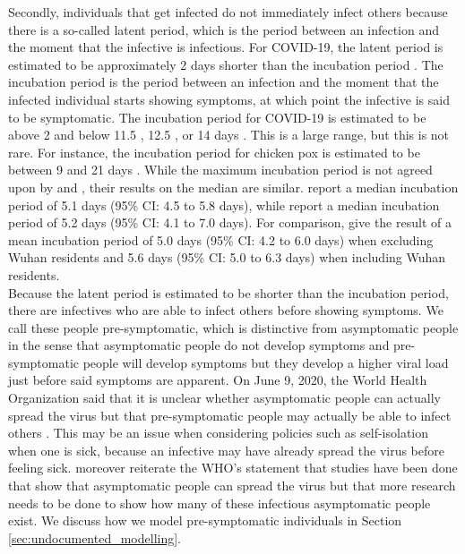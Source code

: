 \documentclass[12pt]{article}
\begin{document}
	Secondly, individuals that get infected do not immediately infect others because there is a so-called latent period, which is the period between an infection and the moment that the infective is infectious. For COVID-19, the latent period is estimated to be approximately 2 days shorter than the incubation period \parencite{he2020temporal}. The incubation period is the period between an infection and the moment that the infected individual starts showing symptoms, at which point the infective is said to be symptomatic. The incubation period for COVID-19 is estimated to be above 2 and below 11.5 \parencite{lauer2020incubation}, 12.5 \parencite{li2020incubation}, or 14 days \parencite{linton2020incubation}. This is a large range, but this is not rare. For instance, the incubation period for chicken pox is estimated to be between 9 and 21 days \parencite{papadopoulos2018chickenpox}. While the maximum incubation period is not agreed upon by \textcite{lauer2020incubation} and \textcite{li2020incubation}, their results on the median are similar. \textcite{lauer2020incubation} report a median incubation period of 5.1 days (95\% CI: 4.5 to 5.8 days), while \textcite{li2020incubation} report a median incubation period of 5.2 days (95\% CI: 4.1 to 7.0 days). For comparison, \textcite{linton2020incubation} give the result of a mean incubation period of 5.0 days (95\% CI: 4.2 to 6.0 days) when excluding Wuhan residents and 5.6 days (95\% CI: 5.0 to 6.3 days) when including Wuhan residents. \\
	
	Because the latent period is estimated to be shorter than the incubation period, there are infectives who are able to infect others before showing symptoms. We call these people pre-symptomatic, which is distinctive from asymptomatic people in the sense that asymptomatic people do not develop symptoms and pre-symptomatic people will develop symptoms but they develop a higher viral load just before said symptoms are apparent. On June 9, 2020, the World Health Organization said that it is unclear whether asymptomatic people can actually spread the virus but that pre-symptomatic people may actually be able to infect others \parencite{bloomberg2020AsymptomaticSpread}. This may be an issue when considering policies such as self-isolation when one is sick, because an infective may have already spread the virus before feeling sick. \textcite{bloomberg2020AsymptomaticSpread} moreover reiterate the WHO's statement that studies have been done that show that asymptomatic people can spread the virus but that more research needs to be done to show how many of these infectious asymptomatic people exist. We discuss how we model pre-symptomatic individuals in Section \ref{sec:undocumented_modelling}. \\
	
\end{document}
